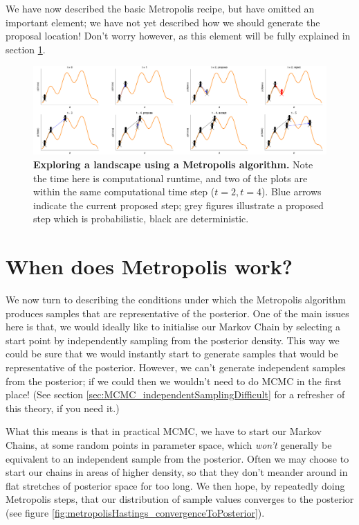 \documentclass[11pt,fullpage]{book}
\begin{document}
We have now described the basic Metropolis recipe, but have omitted an important element; we have not yet described how we should generate the proposal location! Don't worry however, as this element will be fully explained in section \ref{sec:metropolisHastings_conditionsForMetropolis}.

\begin{figure}
\centerline{\includegraphics[width=1.5\textwidth]{metropolisHastings_walker.pdf}}
\caption{\textbf{Exploring a landscape using a Metropolis algorithm.} Note the time here is computational runtime, and two of the plots are within the same computational time step ($t=2,t=4$). Blue arrows indicate the current proposed step; grey figures illustrate a proposed step which is probabilistic, black are deterministic.}\label{fig:metropolisHastings_walker}
\end{figure}

\section{When does Metropolis work?}\label{sec:metropolisHastings_conditionsForMetropolis}
We now turn to describing the conditions under which the Metropolis algorithm produces samples that are representative of the posterior. One of the main issues here is that, we would ideally like to initialise our Markov Chain by selecting a start point by independently sampling from the posterior density. This way we could be sure that we would instantly start to generate samples that would be representative of the posterior. However, we can't generate independent samples from the posterior; if we could then we wouldn't need to do MCMC in the first place! (See section \ref{sec:MCMC_independentSamplingDifficult} for a refresher of this theory, if you need it.) 

What this means is that in practical MCMC, we have to start our Markov Chains, at some random points in parameter space, which \textit{won't} generally be equivalent to an independent sample from the posterior. Often we may choose to start our chains in areas of higher density, so that they don't meander around in flat stretches of posterior space for too long. We then hope, by repeatedly doing Metropolis steps, that our distribution of sample values converges to the posterior (see figure \ref{fig:metropolisHastings_convergenceToPosterior}).
\end{document}
